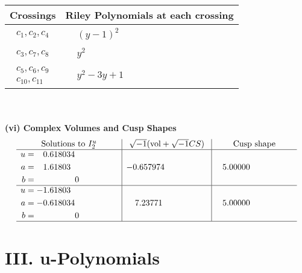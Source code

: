 \documentclass[1p]{elsarticle_modified}
\theoremstyle{definition}
\newcommand{\I}{\sqrt{-1}}
\begin{document}
\begin{tabular}{m{50pt}|m{274pt}}
Crossings & \hspace{64pt}Riley Polynomials at each crossing \\
\hline $$\begin{aligned}c_{1},c_{2},c_{4}\end{aligned}$$&$\begin{aligned}
&(y-1)^2
\end{aligned}$\\
\hline $$\begin{aligned}c_{3},c_{7},c_{8}\end{aligned}$$&$\begin{aligned}
&y^2
\end{aligned}$\\
\hline $$\begin{aligned}c_{5},c_{6},c_{9}\\c_{10},c_{11}\end{aligned}$$&$\begin{aligned}
&y^2-3 y+1
\end{aligned}$\\
\hline
\end{tabular}\\~\\
\newpage\flushleft \textbf{(vi) Complex Volumes and Cusp Shapes}
$$\begin{array}{c|c|c}  
\text{Solutions to }I^u_{2}& \I (\text{vol} + \sqrt{-1}CS) & \text{Cusp shape}\\
 \hline 
\begin{aligned}
u &= \phantom{-}0.618034\phantom{ +0.000000I} \\
a &= \phantom{-}1.61803\phantom{ +0.000000I} \\
b &= \phantom{-0.000000 } 0\end{aligned}
 & -0.657974\phantom{ +0.000000I} & \phantom{-}5.00000\phantom{ +0.000000I} \\ \hline\begin{aligned}
u &= -1.61803\phantom{ +0.000000I} \\
a &= -0.618034\phantom{ +0.000000I} \\
b &= \phantom{-0.000000 } 0\end{aligned}
 & \phantom{-}7.23771\phantom{ +0.000000I} & \phantom{-}5.00000\phantom{ +0.000000I}\\
 \hline 
 \end{array}$$\newpage
\newpage\renewcommand{\arraystretch}{1}
\centering \section*{ III. u-Polynomials}
\end{document}
